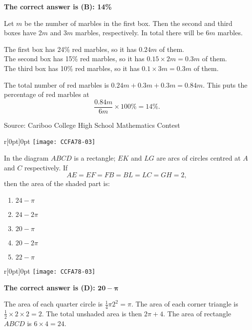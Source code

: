 \documentclass{article}
\begin{document}
\textbf{The correct answer is (B): 14\%}

Let $m$ be the number of marbles in the first box. Then the second and third boxes have 2$m$ and $3m$ marbles, respectively. In total there will be $6m$ marbles.

The first box has 24\% red marbles, so it has $0.24m$ of them.\\
The second box has 15\% red marbles, so it has $0.15\times2m = 0.3m$ of them.\\
The third box has 10\% red marbles, so it has $0.1\times3m= 0.3m$ of them.

The total number of red marbles is $0.24m+0.3m+0.3m = 0.84m$. This puts the percentage of red marbles at
\[
\frac{0.84m}{6m}\times100\% = 14\%.
\]

\vskip 1.5cm


\scriptsize
Source: Cariboo College High School Mathematics Contest

\normalsize
\begin{wrapfigure}[5]{r}[0pt]{0pt}
	\texttt{[image: CCFA78-03]}
\end{wrapfigure}
In the diagram $ABCD$ is a rectangle; $EK$ and $LG$ are arcs of circles centred at $A$ and $C$ respectively. If
\[
AE=EF=FB=BL=LC=GH=2,
\]
then the area of the shaded part is:
\begin{enumerate}[noitemsep,topsep=0mm,leftmargin=*,widest=D,label=\Alph*)]
	\item $24-\pi$
	\item $24-2\pi$
	\item $20-\pi$
	\item $20-2\pi$
	\item $22-\pi$
\end{enumerate}

\begin{wrapfigure}[7]{r}[0pt]{0pt}
	\texttt{[image: CCFA78-03]}
\end{wrapfigure}
\textbf{The correct answer is (D): $\mathbf{20-\boldsymbol{\pi}}$}

The area of each quarter circle is $\frac{1}{4}\pi2^2=\pi$. The area of each corner triangle is $\frac{1}{2}\times2\times2=2$. The total unshaded area is then $2\pi+4$. The area of rectangle $ABCD$ is $6\times4=24$.
\end{document}
